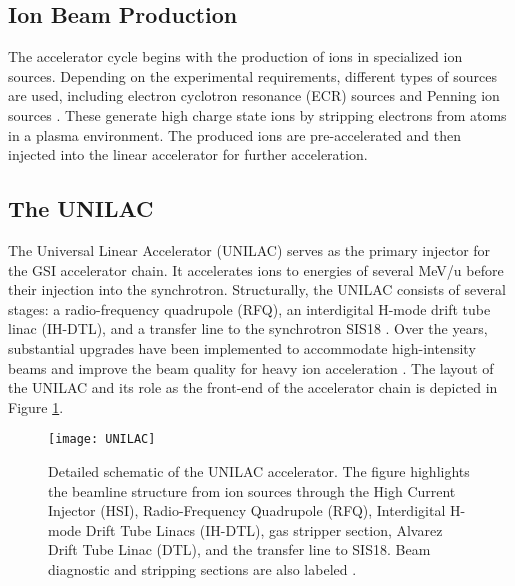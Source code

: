 
\subsection{Ion Beam Production}

The accelerator cycle begins with the production of ions in specialized ion sources. Depending on the experimental requirements, different types of sources are used, including electron cyclotron resonance (ECR) sources and Penning ion sources \cite{hollinger_status_2008}. These generate high charge state ions by stripping electrons from atoms in a plasma environment. The produced ions are pre-accelerated and then injected into the linear accelerator for further acceleration.


\subsection{The UNILAC}

The Universal Linear Accelerator (UNILAC) \cite{vormann_high_2023} serves as the primary injector for the GSI accelerator chain. It accelerates ions to energies of several MeV/u before their injection into the synchrotron. Structurally, the UNILAC consists of several stages: a radio-frequency quadrupole (RFQ), an interdigital H-mode drift tube linac (IH-DTL), and a transfer line to the synchrotron SIS18 \cite{barth_high_2022}. Over the years, substantial upgrades have been implemented to accommodate high-intensity beams and improve the beam quality for heavy ion acceleration . The layout of the UNILAC and its role as the front-end of the accelerator chain is depicted in Figure \ref{fig:UNILAC}.


\begin{figure}
	\texttt{[image: UNILAC]}
	\caption[Detailed schematic of the UNILAC accelerator]{Detailed schematic of the UNILAC accelerator. The figure highlights the beamline structure from ion sources through the High Current Injector (HSI), Radio-Frequency Quadrupole (RFQ), Interdigital H-mode Drift Tube Linacs (IH-DTL), gas stripper section, Alvarez Drift Tube Linac (DTL), and the transfer line to SIS18. Beam diagnostic and stripping sections are also labeled \cite{barth_high_2022}.}
	\label{fig:UNILAC}
\end{figure}



